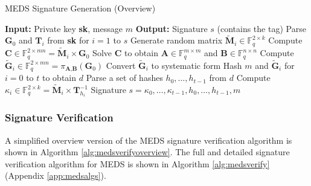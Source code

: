 \documentclass[11pt,a4paper]{report}
\theoremstyle{definition}
\begin{document}
\begin{algorithm}
  \caption{MEDS Signature Generation (Overview)}
  \label{alg:medssignoverview}
  \begin{algorithmic}[1]
    \State \textbf{Input:} Private key \textbf{sk}, message $m$
    \State \textbf{Output:} Signature $s$ (contains the tag)
    \State Parse $\textbf{G}_0$ and $\textbf{T}_i$ from \textbf{sk} for $i = 1$ to $s$
      \State Generate random matrix $\tilde{\textbf{M}}_i \in \mathbb{F}_q^{2 \times k}$
      \State Compute $\textbf{C} \in \mathbb{F}_q^{2 \times mn} = \tilde{\textbf{M}}_i \times \textbf{G}_0$
      \State Solve $\textbf{C}$ to obtain $\textbf{A} \in \mathbb{F}_q^{m \times m}$ and $\textbf{B} \in \mathbb{F}_q^{n \times n}$
      \State Compute $\tilde{\textbf{G}}_i \in \mathbb{F}_q^{2 \times mn} = \pi_{\textbf{A}, \textbf{B}}(\textbf{G}_0)$
      \State Convert $\tilde{\textbf{G}}_i$ to systematic form
    \EndFor
    \State Hash $m$ and $\tilde{\textbf{G}}_i$ for $i = 0$ to $t$ to obtain $d$
    \State Parse a set of hashes $h_0, \ldots, h_{t-1}$ from $d$
        \State Compute $\kappa_i \in \mathbb{F}_q^{2 \times k} = \tilde{\textbf{M}}_i \times \textbf{T}^{-1}_{h_i}$
      \EndIf
    \EndFor
    \State \Return Signature $s = \kappa_0, \ldots, \kappa_{t-1}, h_0, \ldots, h_{t-1}, m$
  \end{algorithmic}
\end{algorithm}

\subsubsection{Signature Verification}
A simplified overview version of the MEDS signature verification algorithm is shown in Algorithm \ref{alg:medsverifyoverview}. The full and detailed signature verification algorithm for MEDS is shown in Algorithm \ref{alg:medsverify} (Appendix \ref{app:medsalgs}).
\end{document}
